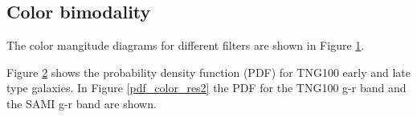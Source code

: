 \subsection{Color bimodality}
The color mangitude diagrams for different filters are shown in Figure \ref{color_magnitude_res}.

Figure \ref{pdf_color_res1} shows the probability density function (PDF) for TNG100 early and late type galaxies. In Figure \ref{pdf_color_res2} the PDF for the TNG100 g-r band and the SAMI g-r band are shown.

\begin{figure}
    \centering
    \caption{}
    \label{color_magnitude_res}
\end{figure}

\begin{figure}
    \centering
    \caption{}
    \label{pdf_color_res1}
\end{figure}

